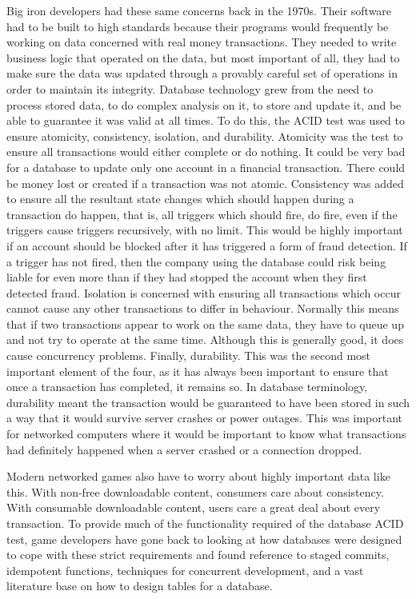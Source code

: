 \documentclass[a4paper,12pt]{book}
\begin{document}
Big iron developers had these same concerns back in the 1970s.
Their software had to be built to high standards because their programs would frequently be working on data concerned with real money transactions.
They needed to write business logic that operated on the data, but most important of all, they had to make sure the data was updated through a provably careful set of operations in order to maintain its integrity.
Database technology grew from the need to process stored data, to do complex analysis on it, to store and update it, and be able to guarantee it was valid at all times.
To do this, the ACID test was used to ensure atomicity, consistency, isolation, and durability.
Atomicity was the test to ensure all transactions would either complete or do nothing.
It could be very bad for a database to update only one account in a financial transaction.
There could be money lost or created if a transaction was not atomic.
Consistency was added to ensure all the resultant state changes which should happen during a transaction do happen, that is, all triggers which should fire, do fire, even if the triggers cause triggers recursively, with no limit.
This would be highly important if an account should be blocked after it has triggered a form of fraud detection.
If a trigger has not fired, then the company using the database could risk being liable for even more than if they had stopped the account when they first detected fraud.
Isolation is concerned with ensuring all transactions which occur cannot cause any other transactions to differ in behaviour.
Normally this means that if two transactions appear to work on the same data, they have to queue up and not try to operate at the same time.
Although this is generally good, it does cause concurrency problems.
Finally, durability.
This was the second most important element of the four, as it has always been important to ensure that once a transaction has completed, it remains so.
In database terminology, durability meant the transaction would be guaranteed to have been stored in such a way that it would survive server crashes or power outages.
This was important for networked computers where it would be important to know what transactions had definitely happened when a server crashed or a connection dropped.

Modern networked games also have to worry about highly important data like this.
With non-free downloadable content, consumers care about consistency.
With consumable downloadable content, users care a great deal about every transaction.
To provide much of the functionality required of the database ACID test, game developers have gone back to looking at how databases were designed to cope with these strict requirements and found reference to staged commits, idempotent functions, techniques for concurrent development, and a vast literature base on how to design tables for a database.
\end{document}
